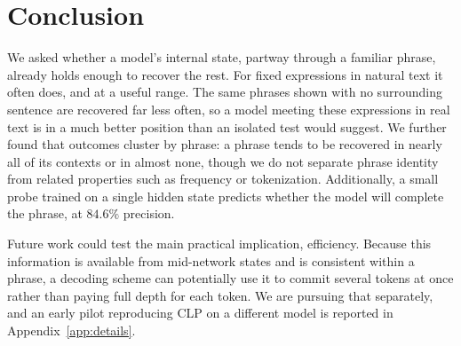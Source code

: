 \section{Conclusion}
\label{sec:conclusion}

We asked whether a model's internal state, partway through a familiar phrase,
already holds enough to recover the rest. For fixed expressions in natural text
it often does, and at a useful range. 
The same phrases
shown with no surrounding sentence are recovered far less often, so a model
meeting these expressions in real text is in a much better position than an
isolated test would suggest. We further found that outcomes cluster by phrase: a phrase tends to be
recovered in nearly all of its contexts or in almost none, though we do not
separate phrase identity from related properties such as frequency or
tokenization. Additionally, a small probe trained on a single hidden state predicts whether
the model will complete the phrase, at $84.6\%$ precision.


Future work could test the main practical implication, efficiency. Because this
information is available from mid-network states and is consistent within a
phrase, a decoding scheme can potentially use it to commit
several tokens at once rather than paying full depth for each token. We are
pursuing that separately, and an early pilot reproducing CLP
\citep{xie-zhou-2026-clp} on a different model is reported in
Appendix~\ref{app:details}. %
